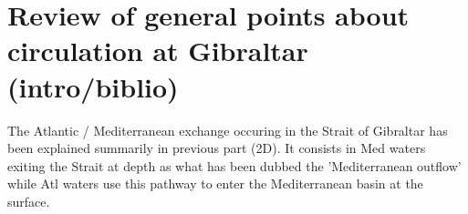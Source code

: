 



\section{Review of general points about circulation at Gibraltar (intro/biblio)}

The Atlantic / Mediterranean exchange occuring in the Strait of Gibraltar has been explained summarily in previous part (2D). It consists in Med waters exiting the Strait at depth as what has been dubbed the 'Mediterranean outflow' while Atl waters use this pathway to enter the Mediterranean basin at the surface.

